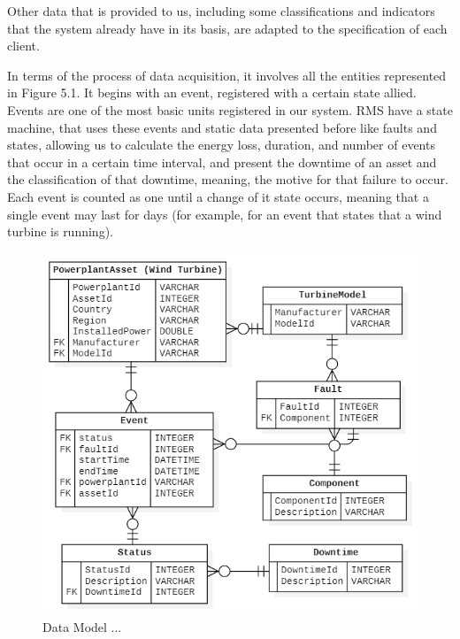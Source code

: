 Other data that is provided to us, including some classifications and indicators that the system already have in its basis, are adapted to the specification of each client.

In terms of the process of data acquisition, it involves all the entities represented in Figure 5.1. It begins with an event, registered with a certain state allied. Events are one of the most basic units registered in our system. RMS have a state machine, that uses these events and static data presented before like faults and states, allowing us to calculate the energy loss, duration, and number of events that occur in a certain time interval, and present the downtime of an asset and the classification of that downtime, meaning, the motive for that failure to occur. Each event is counted as one until a change of it state occurs, meaning that a single event may last for days (for example, for an event that states that a wind turbine is running).

\begin{figure}[htbp]
	\centering
	\includegraphics[scale=0.7]{Chapters/Figures/methodology_fig10.png}
	\caption{Data Model ...}
	\label{fig:Figuras_Tree_silhouettes-vectorial}
\end{figure}

